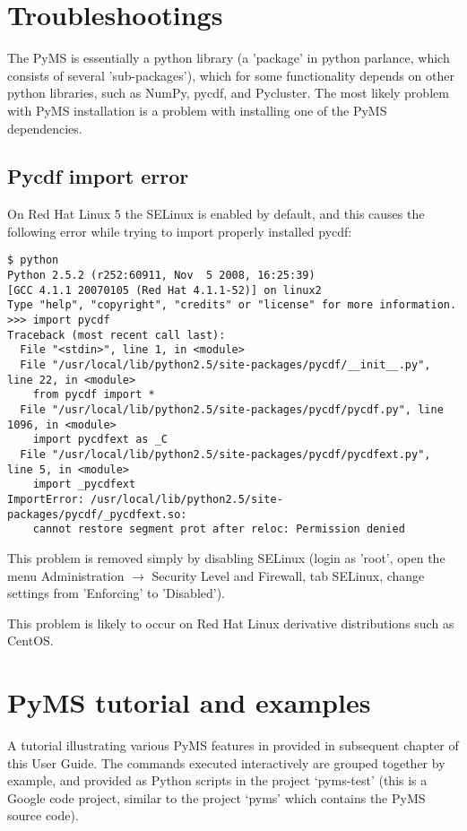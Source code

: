 \section{Troubleshootings}

The PyMS is essentially a python library (a 'package' in python parlance, which
consists of several 'sub-packages'), which for some functionality depends on
other python libraries, such as NumPy, pycdf, and Pycluster. The most likely
problem with PyMS installation is a problem with installing one of the PyMS
dependencies.

\subsection{Pycdf import error}

On Red Hat Linux 5 the SELinux is enabled by default, and this causes the
following error while trying to import properly installed pycdf:

\begin{verbatim}
$ python
Python 2.5.2 (r252:60911, Nov  5 2008, 16:25:39)
[GCC 4.1.1 20070105 (Red Hat 4.1.1-52)] on linux2
Type "help", "copyright", "credits" or "license" for more information.
>>> import pycdf
Traceback (most recent call last):
  File "<stdin>", line 1, in <module>
  File "/usr/local/lib/python2.5/site-packages/pycdf/__init__.py", line 22, in <module>
    from pycdf import *
  File "/usr/local/lib/python2.5/site-packages/pycdf/pycdf.py", line 1096, in <module>
    import pycdfext as _C
  File "/usr/local/lib/python2.5/site-packages/pycdf/pycdfext.py", line 5, in <module>
    import _pycdfext
ImportError: /usr/local/lib/python2.5/site-packages/pycdf/_pycdfext.so:
    cannot restore segment prot after reloc: Permission denied
\end{verbatim}

This problem is removed simply by disabling SELinux (login as 'root', open the menu
Administration $\rightarrow$ Security Level and Firewall, tab SELinux, change settings
from 'Enforcing' to 'Disabled').

This problem is likely to occur on Red Hat Linux derivative distributions such as CentOS.

\section{PyMS tutorial and examples}

A tutorial illustrating various PyMS features in provided in subsequent chapter
of this User Guide. The commands executed interactively are grouped together
by example, and provided as Python scripts in the project `pyms-test' (this is
a Google code project, similar to the project `pyms' which contains the PyMS
source code).


